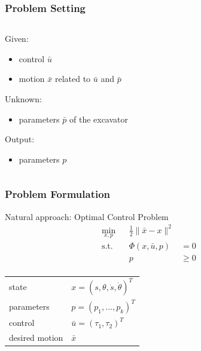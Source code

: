 \begin{frame}
    \frametitle{Problem Setting}
	\begin{columns}
	    
    
    \begin{column}{0.5\textwidth}
    Given:
    \begin{itemize}
        \item{control $\bar{u}$}
        \item{motion $\bar{x}$ related to $\bar{u}$ and $\bar{p}$}
    \end{itemize}

    Unknown:
    \begin{itemize}
        \item{parameters $\bar{p}$ of the excavator}
    \end{itemize}

    Output:
    \begin{itemize}
        \item{parameters $p$}
    \end{itemize}
    \end{column}
    
    \begin{column}{0.4\textwidth}


\end{column}    
    
    
    
    \end{columns}
\end{frame}

\begin{frame}
    \frametitle{Problem Formulation}
    Natural approach: Optimal Control Problem
    \begin{align*}
        \min_{x,p} & & \frac{1}{2} \| \bar{x} - x \|^2 & & \\
        \operatorname{s.t.} & & \Phi(x,\bar{u},p) & = 0 & & \\
                            & & p & \geq 0 & & \\
    \end{align*}

    \begin{tabular}{ll}
        state & $ x = (s,\theta,\dot{s},\dot{\theta})^T $ \\
        parameters & $ p = (p_1,...,p_k)^T $ \\
        control & $ \bar{u} = (\tau_1,\tau_2)^T $ \\
        desired motion & $\bar{x}$ \\
    \end{tabular}
\end{frame}

